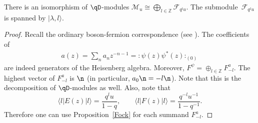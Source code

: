 \begin{Proposition} \label{Boson-Fermion}
There is an isomorphism of $\qD$-modules $\mathcal{M}_u \cong \bigoplus_{l \in \mathbb{Z}} \mathcal{F}_{q^l u}$.
The sub\-module~$\mathcal{F}_{q^l u}$ is spanned by $| \lambda,l \rangle$.
\end{Proposition}

\begin{proof}Recall the ordinary boson-fermion correspondence (see \cite{KR}). The coefficients of
\begin{gather*}
a(z) = \sum_{n} a_n z^{-n-1} = : \! \psi(z) \psi^* (z) \! :_{(0)}
\end{gather*}
are indeed generators of the Heisenberg algebra. Moreover, $F^{\psi} = \oplus_{l \in \mathbb{Z}} F^{a}_{-l}$. The highest vector of $F^{a}_{-l}$ is $\n$ (in particular, $a_0 \n = -l \n $). Note that this is the decomposition of $\qD$-modules as well. Also, note that
\[\langle l | E(z) | l \rangle = \frac{q^{l} u }{1-q}, \qquad \langle l | F(z) | l \rangle = \frac{q^{-l} u^{-1} }{1-q^{-1}}.\]
Therefore one can use Proposition~\ref{Fock} for each summand $F^{a}_{-l}$.
\end{proof}

